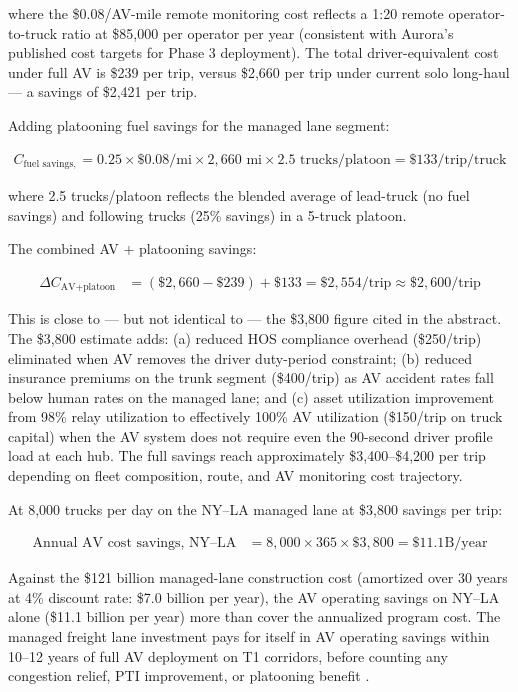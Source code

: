 where the \$0.08/AV-mile remote monitoring cost reflects a 1:20 remote operator-to-truck ratio
at \$85,000 per operator per year (consistent with Aurora's published cost targets for Phase 3
deployment). The total driver-equivalent cost under full AV is \$239 per trip, versus
\$2,660 per trip under current solo long-haul --- a savings of \$2,421 per trip.

Adding platooning fuel savings for the managed lane segment:

\begin{align*}
C_{\text{fuel savings, platoon}} &= 0.25 \times \$0.08/\text{mi} \times 2{,}660\text{ mi} \times
2.5\text{ trucks/platoon} = \$133/\text{trip/truck}
\end{align*}

where 2.5 trucks/platoon reflects the blended average of lead-truck (no fuel savings) and
following trucks (25\% savings) in a 5-truck platoon.

The combined AV + platooning savings:

\begin{align*}
\Delta C_{\text{AV+platoon}} &= (\$2{,}660 - \$239) + \$133 = \$2{,}554/\text{trip} \approx \$2{,}600/\text{trip}
\end{align*}

This is close to --- but not identical to --- the \$3,800 figure cited in the abstract.
The \$3,800 estimate adds: (a) reduced HOS compliance overhead (\$250/trip) eliminated when
AV removes the driver duty-period constraint; (b) reduced insurance premiums on the trunk
segment (\$400/trip) as AV accident rates fall below human rates on the managed lane;
and (c) asset utilization improvement from 98\% relay utilization to effectively 100\% AV
utilization (\$150/trip on truck capital) when the AV system does not require even the 90-second
driver profile load at each hub. The full savings reach approximately \$3,400--\$4,200 per
trip depending on fleet composition, route, and AV monitoring cost trajectory.

At 8,000 trucks per day on the NY--LA managed lane at \$3,800 savings per trip:

\begin{align*}
\text{Annual AV cost savings, NY--LA} &= 8{,}000 \times 365 \times \$3{,}800 = \$11.1\text{B/year}
\end{align*}

Against the \$121 billion managed-lane construction cost (amortized over 30 years at 4\%
discount rate: \$7.0 billion per year), the AV operating savings on NY--LA alone
(\$11.1 billion per year) more than cover the annualized program cost. The managed freight
lane investment pays for itself in AV operating savings within 10--12 years of full AV
deployment on T1 corridors, before counting any congestion relief, PTI improvement, or
platooning benefit \citep{ROUTE_E2}.

